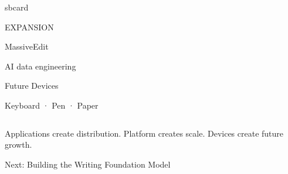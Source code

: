 {\begin{columns}[T,onlytextwidth]
\begin{beamercolorbox}[wd=\linewidth,ht=2.45cm,dp=0.18cm,sep=0.10cm,center,rounded=true,shadow=false]{sbcard}
\begin{minipage}[c][2.18cm][c]{0.88\linewidth}
\centering
{\SBFontTitle\fontsize{9.2}{11}\selectfont\color{SBPrimary}EXPANSION}\par
\vspace{0.08cm}
{\SBFontTitle\fontsize{10.2}{12.2}\selectfont\color{SBText}MassiveEdit}\par
{\SBFontBody\fontsize{7.2}{8.6}\selectfont\color{SBMuted}AI data engineering}\par
\vspace{0.08cm}
{\SBFontTitle\fontsize{10.2}{12.2}\selectfont\color{SBText}Future Devices}\par
{\SBFontBody\fontsize{7.2}{8.6}\selectfont\color{SBMuted}Keyboard · Pen · Paper}
\end{minipage}
\end{beamercolorbox}

\end{columns}

\vspace{0.08cm}

\begin{center}
{\SBFontBody\fontsize{8.8}{10.6}\selectfont\color{SBGray}
Applications create distribution. Platform creates scale. Devices create future growth.
}

\vspace{0.10cm}

{\SBFontTitle\fontsize{8.8}{10.6}\selectfont\color{SBPrimary}
Next: Building the Writing Foundation Model
}
\end{center}
}